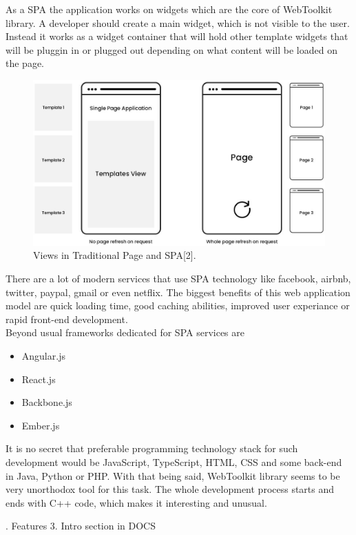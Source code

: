 \documentclass[a4paper,12pt]{article}
\begin{document}
{{\bigskip
As a SPA the application works on widgets which are the core of WebToolkit library. A developer should create a main widget, which is not visible to the user. Instead it works as a widget container that will hold other template widgets that will be pluggin in or plugged out depending on what content will be loaded on the page.  

\begin{figure}[h]
  \centering
    \includegraphics[width=1.0\textwidth]{spa-template}
    \caption{Views in Traditional Page and SPA[2].}
\end{figure} 

\bigskip
There are a lot of modern services that use SPA technology like facebook, airbnb, twitter, paypal, gmail or even netflix. The biggest benefits of this web application model are quick loading time, good caching abilities, improved user experiance or rapid front-end development. \\

\bigskip
Beyond usual frameworks dedicated for SPA services are
\begin{itemize}
	\item  Angular.js
	\item React.js
	\item Backbone.js
	\item Ember.js
\end{itemize}

It is no secret that preferable programming technology stack for such development would be JavaScript, TypeScript, HTML, CSS and some back-end in Java, Python or PHP. With that being said, WebToolkit library seems to be very unorthodox tool for this task. The whole development process starts and ends with C++ code, which makes it interesting and unusual.

. Features
3. Intro section in DOCS}
}
\end{document}
